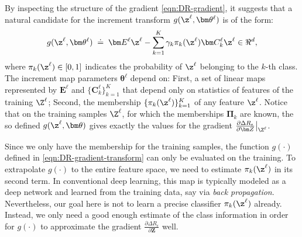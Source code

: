 \documentclass[../../book-main.tex]{subfiles}
\begin{document}
By inspecting the structure of the gradient \eqref{eqn:DR-gradient}, it suggests that a natural candidate for the increment transform $g(\z^\ell, \bm \theta^\ell)$ is of the form:
\begin{equation}
    g(\z^\ell, \bm \theta^\ell) \; \doteq \; \bm E^\ell \z^\ell - \sum_{k=1}^K \gamma_{k} \pi_k(\z^\ell)\bm C_{k}^{\ell}  \z^{\ell}  \in \Re^d,
    \label{eqn:DR-gradient-transform}
\end{equation}
where $\pi_k(\z^\ell) \in [0,1]$ indicates the probability of $\z^{\ell}$ belonging to the $k$-th class. The increment map parameters $\bm \theta^\ell$ depend on: First, a set of linear maps represented by $\bm E^{\ell}$ and $\{ \bm C^{\ell}_{k}\}_{k=1}^{K}$ that depend only on statistics of features of the training $\Z^\ell$; Second, the membership $\{ \pi_k(\z^\ell)\}_{k=1}^K$ of any feature $\z^\ell$. 
Notice that on the training samples $\Z^\ell$, for which the memberships $\bm \Pi_k$ are known,  the so defined $g(\z^\ell, \bm \theta)$ gives exactly the values for the gradient $\frac{\partial \Delta R_{\epsilon}}{\partial \bm Z}\big|_{\Z^\ell}$.  


Since we only have the membership  for the training samples, the function $g(\cdot)$ defined in \eqref{eqn:DR-gradient-transform} can only be evaluated on the training. To extrapolate $g(\cdot)$ to the entire feature space, we need to estimate $\pi_k(\z^\ell)$ in its second term. In conventional deep learning, this map is typically modeled as a deep network and learned from the training data, say via {\em back propagation}. Nevertheless, our goal here is not to learn a precise classifier $\pi_{k}(\z^\ell)$ already. Instead, we only need a good enough estimate of the class information in order for $g(\cdot)$ to approximate the gradient $\frac{\partial \Delta R_{\epsilon}}{\partial \bm Z}$ well. 
\end{document}
